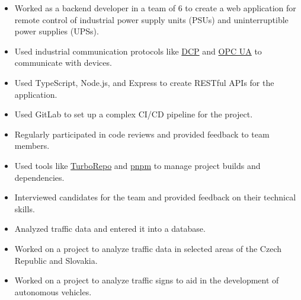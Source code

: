\documentclass[10pt,a4paper,ragged2e,withhyper]{altacv}
\begin{document}


\makecvheader
\vspace{1cm}

\begin{paracol}{2}

	\begin{itemize}
		\item Worked as a backend developer in a team of 6 to create a web application for remote control of industrial power supply units (PSUs) and uninterruptible power supplies (UPSs).
		\item Used industrial communication protocols like \href{https://profinetuniversity.com/naming-addressing/profinet-dcp/}{DCP} and \href{https://opcfoundation.org/about/opc-technologies/opc-ua/}{OPC UA} to communicate with devices.
		\item Used TypeScript, Node.js, and Express to create RESTful APIs for the application.
		\item Used GitLab to set up a complex CI/CD pipeline for the project.
		\item Regularly participated in code reviews and provided feedback to team members.
		\item Used tools like \href{https://turborepo.com/}{TurboRepo} and \href{https://pnpm.io/}{pnpm} to manage project builds and dependencies.
		\item Interviewed candidates for the team and provided feedback on their technical skills.
	\end{itemize}

	\divider

	\begin{itemize}
		\item Analyzed traffic data and entered it into a database.
		\item Worked on a project to analyze traffic data in selected areas of the Czech Republic and Slovakia.
		\item Worked on a project to analyze traffic signs to aid in the development of autonomous vehicles.
	\end{itemize}


\end{paracol}
\end{document}
